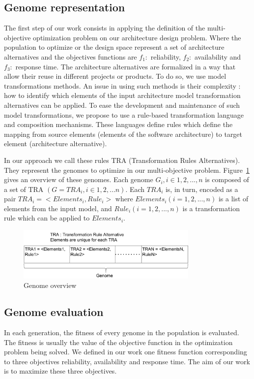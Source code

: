 \documentclass[conference]{IEEEtran}
\begin{document}
\subsection{Genome representation}
The first step of our work consists in applying the definition of the multi-objective optimization problem on our architecture design problem. Where the population to optimize or the design space represent a set of architecture alternatives and the objectives functions are $f_{1}:$ reliability, $f_{2}:$ availability and $f_{3}:$ response time. The architecture alternatives are formalized in a way that allow their reuse in different projects or products. To do so, we use model transformations methods. An issue in using such methods is their complexity : how to identify which elements of the input architecture model transformation alternatives can be applied. To ease the development and maintenance of such model transformations, we propose to use a rule-based transformation language and composition mechanisms. These languages define rules which define the mapping from source elements (elements of the software architecture) to target element (architecture alternative). 

In our approach we call these rules TRA (Transformation Rules Alternatives). They represent the genomes to optimize in our multi-objective problem. Figure~\ref{genome} gives an overview of these genomes. Each genome $G_{i}, i \in {1,2,...,n}$ is composed of a set of TRA $(G = {TRA_{i}, i \in {1,2,...n}})$. Each $TRA_{i}$ is, in turn, encoded as a pair $TRA_{i} = <Elements_{i},Rule_{i}>$ where $Elements_{i} (i ={1,2,...,n})$ is a list of elements from the input model, and $Rule_{i} (i ={1,2,...,n})$ is a transformation rule which can be applied to $Elements_{i}$.


\begin{figure}[!t]
\centering
\includegraphics[width=3.49in]{genome.pdf}
\caption{Genome overview}
\label{genome}
\end{figure}

\subsection{Genome evaluation}
In each generation, the fitness of every genome in the population is evaluated. The fitness is usually the value of the objective function in the optimization problem being solved. We defined in our work one fitness function corresponding to three objectives reliability, availability and response time.
The aim of our work is to maximize these three objectives. 
\end{document}
